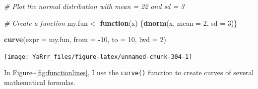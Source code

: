 \documentclass[]{book}
\newenvironment{Shaded}{\begin{snugshade}}{\end{snugshade}}
\newcommand{\KeywordTok}[1]{\textcolor[rgb]{0.13,0.29,0.53}{\textbf{#1}}}
\newcommand{\DataTypeTok}[1]{\textcolor[rgb]{0.13,0.29,0.53}{#1}}
\newcommand{\DecValTok}[1]{\textcolor[rgb]{0.00,0.00,0.81}{#1}}
\newcommand{\StringTok}[1]{\textcolor[rgb]{0.31,0.60,0.02}{#1}}
\newcommand{\CommentTok}[1]{\textcolor[rgb]{0.56,0.35,0.01}{\textit{#1}}}
\newcommand{\ControlFlowTok}[1]{\textcolor[rgb]{0.13,0.29,0.53}{\textbf{#1}}}
\newcommand{\OperatorTok}[1]{\textcolor[rgb]{0.81,0.36,0.00}{\textbf{#1}}}
\newcommand{\NormalTok}[1]{#1}
\theoremstyle{definition}
\theoremstyle{definition}
\theoremstyle{remark}
\begin{document}
\begin{Shaded}
\begin{Highlighting}[]
\CommentTok{# Plot the normal distribution with mean = 22 and sd = 3}

\CommentTok{# Create a function}
\NormalTok{my.fun <-}\StringTok{ }\ControlFlowTok{function}\NormalTok{(x) \{}\KeywordTok{dnorm}\NormalTok{(x, }\DataTypeTok{mean =} \DecValTok{2}\NormalTok{, }\DataTypeTok{sd =} \DecValTok{3}\NormalTok{)\}}

\KeywordTok{curve}\NormalTok{(}\DataTypeTok{expr =}\NormalTok{ my.fun, }
      \DataTypeTok{from =} \OperatorTok{-}\DecValTok{10}\NormalTok{, }
      \DataTypeTok{to =} \DecValTok{10}\NormalTok{, }\DataTypeTok{lwd =} \DecValTok{2}\NormalTok{)}
\end{Highlighting}
\end{Shaded}

\begin{center}\texttt{[image: YaRrr\_files/figure-latex/unnamed-chunk-304-1]} \end{center}

In Figure\textasciitilde{}\ref{fig:functionlines}, I use the
\texttt{curve()} function to create curves of several mathematical
formulas.
\end{document}
